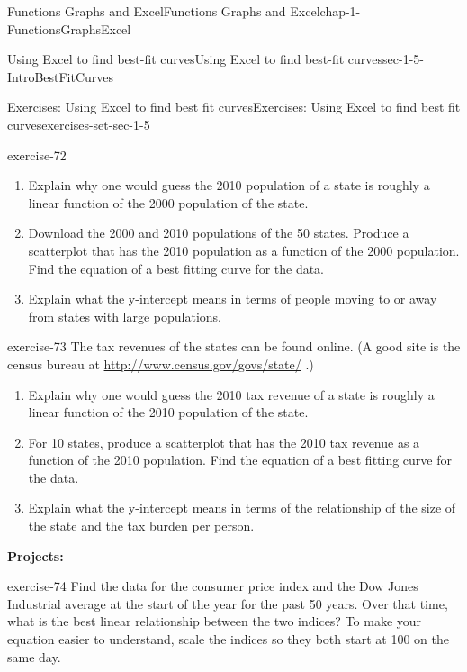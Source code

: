 \documentclass[oneside,10pt,]{book}
\newcommand{\terminology}[1]{\textbf{#1}}
\numberwithin{equation}{section}
\begin{document}
\begin{chapterptx}{Functions Graphs and Excel}{}{Functions Graphs and Excel}{}{}{chap-1-FunctionsGraphsExcel}
\begin{sectionptx}{Using Excel to find best-fit curves}{}{Using Excel to find best-fit curves}{}{}{sec-1-5-IntroBestFitCurves}
\begin{exercises-subsection-numberless}{Exercises: Using Excel to find best fit curves}{}{Exercises: Using Excel to find best fit curves}{}{}{exercises-set-sec-1-5}
\begin{divisionexercise}{8}{}{}{exercise-72}
\leavevmode%
\begin{enumerate}[label=(\alph*)]
\item\hypertarget{li-134}{}\hypertarget{p-454}{}%
Explain why one would guess the 2010 population of a state is roughly a linear function of the 2000 population of the state.%
\item\hypertarget{li-135}{}\hypertarget{p-455}{}%
Download the 2000 and 2010 populations of the 50 states.  Produce a scatterplot that has the 2010 population as a function of the 2000 population.  Find the equation of a best fitting curve for the data.%
\item\hypertarget{li-136}{}\hypertarget{p-456}{}%
Explain what the y-intercept means in terms of people moving to or away from states with large populations.%
\end{enumerate}
\end{divisionexercise}%
\begin{divisionexercise}{9}{}{}{exercise-73}%
\hypertarget{p-457}{}%
The tax revenues of the states can be found online.  (A good site is the census bureau at \href{http://www.census.gov/govs/state/}{http:\slash{}\slash{}www.census.gov\slash{}govs\slash{}state\slash{}} .)%
\leavevmode%
\begin{enumerate}[label=(\alph*)]
\item\hypertarget{li-137}{}\hypertarget{p-458}{}%
Explain why one would guess the 2010 tax revenue of a state is roughly a linear function of the 2010 population of the state.%
\item\hypertarget{li-138}{}\hypertarget{p-459}{}%
For 10 states, produce a scatterplot that has the 2010 tax revenue as a function of the 2010 population.  Find the equation of a best fitting curve for the data.%
\item\hypertarget{li-139}{}\hypertarget{p-460}{}%
Explain what the y-intercept means in terms of the relationship of the size of the state and the tax burden per person.%
\end{enumerate}
\end{divisionexercise}%
\hypertarget{p-461}{}%
\terminology{Projects:}%
\begin{divisionexercise}{10}{}{}{exercise-74}%
\hypertarget{p-462}{}%
Find the data for the consumer price index and the Dow Jones Industrial average at the start of the year for the past 50 years.  Over that time, what is the best linear relationship between the two indices?  To make your equation easier to understand, scale the indices so they both start at 100 on the same day.%
\end{divisionexercise}%

\end{exercises-subsection-numberless}
\end{sectionptx}
\end{chapterptx}
\end{document}
